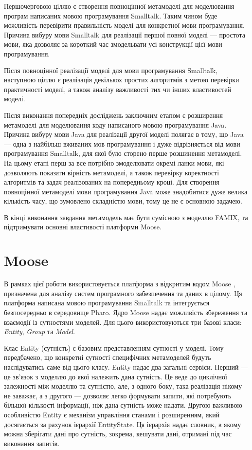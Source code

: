 \documentclass[12pt,a4paper]{article}
\begin{document}
Першочерговою ціллю є створення повноцінної метамоделі для моделювання програм написаних мовою програмування Smalltalk. Таким чином буде можливість перевірити правильність моделі для конкретної мови програмування. Причина вибуру мови Smalltalk для реалізації першої повної моделі --- простота мови, яка дозволяє за короткий час змодельвати усі конструкції цієї мови програмування.

Після повноцінної реалізації моделі для мови програмування Smalltalk, наступною ціллю є реалізація декількох простих алгоритмів з метою перевірки практичності моделі, а також аналізу важливості тих чи інших властивостей моделі.

Після виконання попередніх досліджень заключним етапом є розширення метамоделі для моделювання коду написаного мовою програмування Java. Причина вибуру мови Java для реалізації другої моделі полягає в тому, що Java --- одна з найбільш вживаних мов програмування і дуже відрізняється від мови програмування Smalltalk, для якої було сторено перше розшинення метамоделі. На цьому етапі перш за все потрібно змоделювати окремі ланки мови, які дозволяють показати вірність метамоделі, а також перевірку коректності алгоритмів та задач реалізованих на попередньому кроці. Для створення повноцінної метамоделі мови програмування Java може знадобитися дуже велика кількість часу, що зумовлено складністю мови, тому це не є основною задачею.

В кінці виконання завдання метамодель має бути сумісною з моделлю FAMIX, та підтримувати основні властивості платформи Moose. 

\clearpage

\section{Moose}

В рамках цієї роботи використовується платформа з відкритим кодом Moose \cite{moose}, призначена для аналізу систем програмного забезпечення та даних в цілому. Ця платформа написана мовою програмування Smalltalk та інтегрується безпосередньо в середовище Pharo. Ядро Moose надає можливість збереження та взаємодії із сутностями моделей. Для цього використовуються три базові класи: \emph{Entity}, \emph{Group} та \emph{Model}.

Клас Entity (сутність) є базовим представленням сутності у моделі. Тому передбачено, що конкретні сутності специфічних метамоделей будуть наслідуватись саме від цього класу. Entity надає два загальні сервіси. Перший --- це зв'язок з моделлю до якої належить дана сутність. Це веде до циклічної залежності між моделлю та сутністю, але, з одного боку, така реалізація нікому не заважає, а з другого --- дозволяє легко формувати запити, які потребують більшої кількості інформації, ніж дана сутність може надати. Другою важливою особливістю Entity є механізм управління станами і розширенням, який досягається за рахунок ієрархії EntityState. Ця ієрархія надає словник, в якому можна зберігати дані про сутність, зокрема, кешувати дані, отримані під час виконання запитів.
\end{document}
